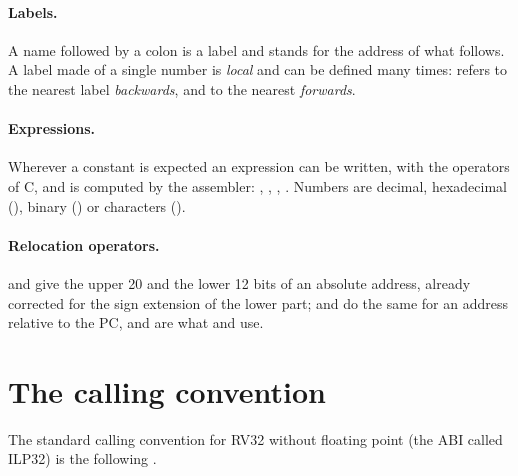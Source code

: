 \paragraph{Labels.} A name followed by a colon is a label and stands for the
address of what follows. A label made of a single number is \emph{local} and
can be defined many times:  refers to the nearest label 
\emph{backwards}, and  to the nearest \emph{forwards}.

\paragraph{Expressions.} Wherever a constant is expected an expression can be
written, with the operators of C, and is computed by the assembler:
, , ,
. Numbers are decimal, hexadecimal (), binary
() or characters ().

\paragraph{Relocation operators.}  and  give
the upper 20 and the lower 12 bits of an absolute address, already corrected
for the sign extension of the lower part;  and
 do the same for an address relative to the PC, and
are what  and  use.

\section{The calling convention}

The standard calling convention for RV32 without floating point (the ABI
called ILP32) is the following \citep{riscvabi}.


